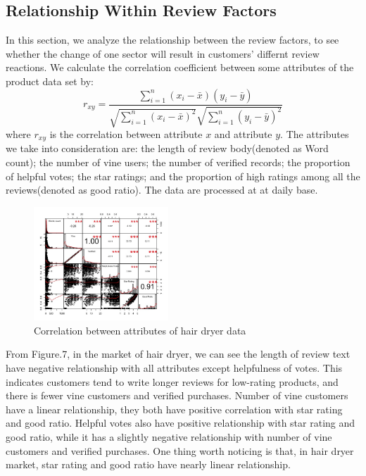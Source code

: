 \documentclass[12pt]{article}
\begin{document}
\subsection{Relationship Within Review Factors}
In this section, we analyze the relationship between the review factors, to see whether the change of one sector will result in customers' differnt review reactions. We calculate the correlation coefficient between some attributes of the product data set by:
\[r_{xy}=\frac{\sum_{i=1}^{n}\left(x_{i}-\bar{x}\right)\left(y_{i}-\bar{y}\right)}{\sqrt{\sum_{i=1}^{n}\left(x_{i}-\bar{x}\right)^{2}} \sqrt{\sum_{i=1}^{n}\left(y_{i}-\bar{y}\right)^{2}}}\]
where $r_{xy}$ is the correlation between attribute $x$ and attribute $y$. The attributes we take into consideration are: the length of review body(denoted as Word count); the number of vine users; the number of verified records; the proportion of helpful votes; the star ratings; and the proportion of high ratings among all the reviews(denoted as good ratio). The data are processed at at daily base. 

\begin{figure}[h]
\caption{Correlation between attributes of hair dryer data}
\centering
\includegraphics[width=0.45\textwidth]{hairCorr1.jpeg}
\end{figure}
From Figure.7, in the market of hair dryer, we can see the length of review text have negative relationship with all attributes except helpfulness of votes. This indicates customers tend to write longer reviews for low-rating products, and there is fewer vine customers and verified purchases. Number of vine customers have a linear relationship, they both have positive correlation with star rating and good ratio. Helpful votes also have positive relationship with star rating and good ratio, while it has a slightly negative relationship with number of vine customers and verified purchases. One thing worth noticing is that, in hair dryer market, star rating and good ratio have nearly linear relationship.
\end{document}
